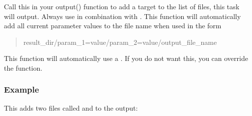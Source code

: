 \documentclass[letterpaper,10pt,english]{sphinxmanual}
\begin{document}
\begin{fulllineitems}
\begin{sphinxVerbatim}[commandchars=\\\{\}]
            

           
\end{sphinxVerbatim}

\begin{fulllineitems}
\label{\detokenize{documentation/api:b2luigi.Task.add_to_output}}
Call this in your output() function to add a target to the list of files,
this task will output.
Always use in combination with .
This function will automatically add all current parameter values to
the file name when used in the form
\begin{quote}

result\_dir/param\_1=value/param\_2=value/output\_file\_name
\end{quote}

This function will automatically use a .
If you do not want this, you can override the  function.
\subsubsection*{Example}

This adds two files called  and  to the output:


\end{fulllineitems}
\end{fulllineitems}
\end{document}
